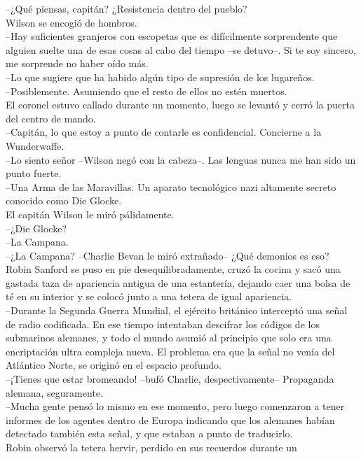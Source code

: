 --¿Qué piensas, capitán? ¿Resistencia dentro del pueblo?\\
Wilson se encogió de hombros.\\
--Hay suficientes granjeros con escopetas que es difícilmente
sorprendente que alguien suelte una de esas cosas al cabo del tiempo
--se detuvo--. Si te soy sincero, me sorprende no haber oído más.\\
--Lo que sugiere que ha habido algún tipo de supresión de los
lugareños.\\
--Posiblemente. Asumiendo que el resto de ellos no estén muertos.\\
El coronel estuvo callado durante un momento, luego se levantó y cerró
la puerta del centro de mando.\\
--Capitán, lo que estoy a punto de contarle es confidencial. Concierne a
la Wunderwaffe.\\
--Lo siento señor --Wilson negó con la cabeza--. Las lenguas nunca me
han sido un punto fuerte.\\
--Una Arma de las Maravillas. Un aparato tecnológico nazi altamente
secreto conocido como Die Glocke.\\
El capitán Wilson le miró pálidamente.\\
--¿Die Glocke?\\
--La Campana.\\
--¿La Campana? --Charlie Bevan le miró extrañado-- ¿Qué demonios es
eso?\\[2\baselineskip]Robin Sanford se puso en pie desequilibradamente,
cruzó la cocina y sacó una gastada taza de apariencia antigua de una
estantería, dejando caer una bolsa de té en su interior y se colocó
junto a una tetera de igual apariencia.\\
--Durante la Segunda Guerra Mundial, el ejército británico interceptó
una señal de radio codificada. En ese tiempo intentaban descifrar los
códigos de los submarinos alemanes, y todo el mundo asumió al principio
que solo era una encriptación ultra compleja nueva. El problema era que
la señal no venía del Atlántico Norte, se originó en el espacio
profundo.\\
--¡Tienes que estar bromeando! --bufó Charlie, despectivamente--
Propaganda alemana, seguramente.\\
--Mucha gente pensó lo mismo en ese momento, pero luego comenzaron a
tener informes de los agentes dentro de Europa indicando que los
alemanes habían detectado también esta señal, y que estaban a punto de
traducirlo.\\
Robin observó la tetera hervir, perdido en sus recuerdos durante un
